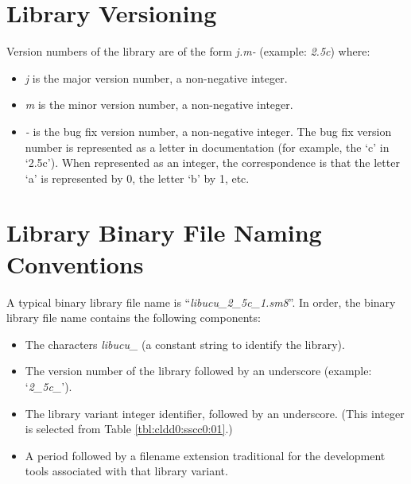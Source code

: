 \section{Library Versioning}
\label{cldd0:slvn0}

Version numbers of the library are of the
form \emph{j.m-} (example: \emph{2.5c}) where:

\begin{itemize}
\item \emph{j} is the major version number, a non-negative
      integer.
\item \emph{m} is the minor version number, a non-negative
      integer.
\item \emph{-} is the bug fix version number, a non-negative
      integer.  The bug fix version number
      is represented as a letter in documentation (for
      example, the `c' in `2.5c').
      When represented as an integer, the correspondence
      is that the letter `a' is represented by 0,
      the letter `b' by 1, etc.
\end{itemize}


\section{Library Binary File Naming Conventions}
\label{cldd0:slpn0}

%
A typical binary library file name is 
``\emph{libucu\_2\_5c\_1.sm8}''.
In order, the binary library file name contains the
following components:

\begin{itemize}
\item The characters \emph{libucu\_} (a constant string
      to identify the library).
\item The version number of the library followed by an
      underscore
      (example: `\emph{2\_5c\_}').
\item The library variant integer identifier, followed by
      an underscore.  (This integer
      is selected from Table \ref{tbl:cldd0:sscc0:01}.)
\item A period followed by a filename extension traditional
      for the
      development tools associated with that library
      variant.
\end{itemize}


